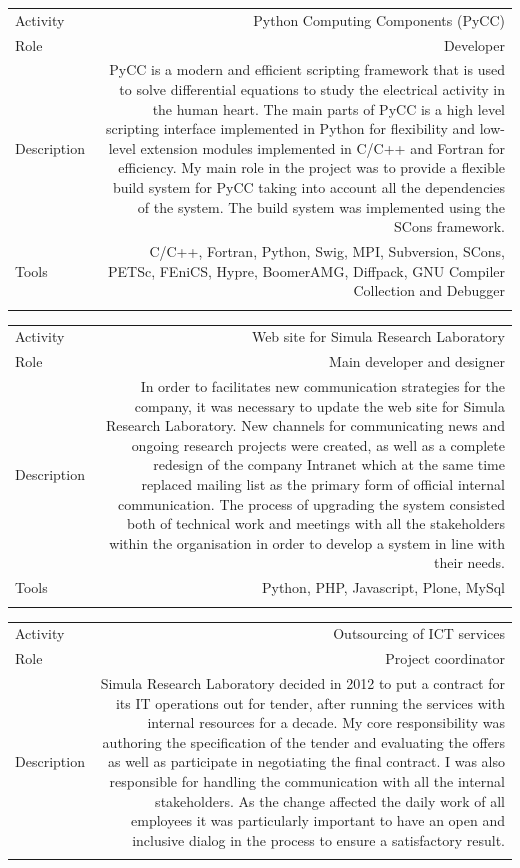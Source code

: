 \documentclass[english,a4paper,11pt]{article}
\begin{document}
\begin{tabular}{@{}LR}
Activity & Python Computing Components (PyCC) \\
Role & Developer \\
Description & PyCC is a modern and efficient scripting framework that is used to solve differential equations to study the electrical activity in the human heart. The main parts of PyCC is a high level scripting interface implemented in Python for flexibility and low-level extension modules implemented in C/C++ and Fortran for efficiency. My main role in the project was to provide a flexible build system for PyCC taking into account all the dependencies of the system. The build system was implemented using the SCons framework. \\
Tools & C/C++, Fortran, Python, Swig, MPI, Subversion, SCons, PETSc, FEniCS, Hypre, BoomerAMG, Diffpack, GNU Compiler Collection and Debugger  \\ 
\addlinespace \bottomrule[.1pt] \addlinespace
\end{tabular}

\begin{tabular}{@{}LR}
Activity & Web site for Simula Research Laboratory \\
Role & Main developer and designer \\
Description & In order to facilitates new communication strategies for the company, it was necessary to update the web site for Simula Research Laboratory. New channels for communicating news and ongoing research projects were created, as well as a complete redesign of the company Intranet which at the same time replaced mailing list as the primary form of official internal communication. The process of upgrading the system consisted both of technical work and meetings with all the stakeholders within the organisation in order to develop a system in line with their needs.\\
Tools & Python, PHP, Javascript, Plone, MySql \\ 
\addlinespace \bottomrule[.1pt] \addlinespace
\end{tabular}

\begin{tabular}{@{}LR}
Activity & Outsourcing of ICT services \\
Role & Project coordinator \\
Description & Simula Research Laboratory decided in 2012 to put a contract for its IT operations out for tender, after running the services with internal resources for a decade. My core responsibility was authoring the specification of the tender and evaluating the offers as well as participate in negotiating the final contract. I was also responsible for handling the communication with all the internal stakeholders. As the change affected the daily work of all employees it was particularly important to have an open and inclusive dialog in the process to ensure a satisfactory result. \\ 
\addlinespace \bottomrule[.1pt] \addlinespace
\end{tabular}
\end{document}
